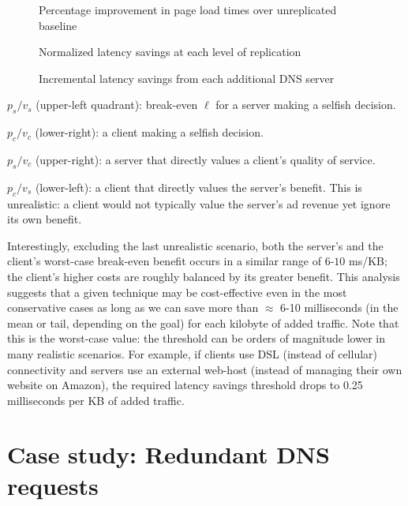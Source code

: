 \documentclass{sigcomm-alternate}
\begin{document}
\begin{figure*}[p]
\caption{Percentage improvement in page load times over unreplicated baseline}
\label{fig:relative}
\end{figure*}

\begin{figure*}[p]
\caption{Normalized latency savings at each level of replication}
\label{fig:ell-abs}
\end{figure*}

\begin{figure*}[p]
\caption{Incremental latency savings from each additional DNS server}
\label{fig:ell-incr}
\end{figure*}

\begin{itemize*}
\item $p_s / v_s$ (upper-left quadrant): break-even $\ell$ for a server making a selfish decision.
\item $p_c / v_c$ (lower-right): a client making a selfish decision.
\item $p_s / v_c$ (upper-right): a server that directly values a client's quality of service.
\item $p_c / v_s$ (lower-left): a client that directly values the server's benefit.  This is unrealistic: a client would not typically value the server's ad revenue yet ignore its own benefit.
\end{itemize*}

Interestingly, excluding the last unrealistic scenario, both the server's and the client's worst-case break-even benefit occurs in a similar range of $6$-$10$ ms/KB; the client's higher costs are roughly balanced by its greater benefit.  This analysis suggests that a given technique may be cost-effective even in the most conservative cases as long as we can save more than $\approx$ 6-10 milliseconds (in the mean or tail, depending on the goal) for each kilobyte of added traffic.  Note that this is the worst-case value: the threshold can be orders of magnitude lower in many realistic scenarios.  For example, if clients use DSL (instead of cellular) connectivity and servers use an external web-host (instead of managing their own website on Amazon), the required latency savings threshold drops to 0.25 milliseconds per KB of added traffic.



\section{Case study: Redundant DNS\\requests}
\label{sec:case-study}
\end{document}
